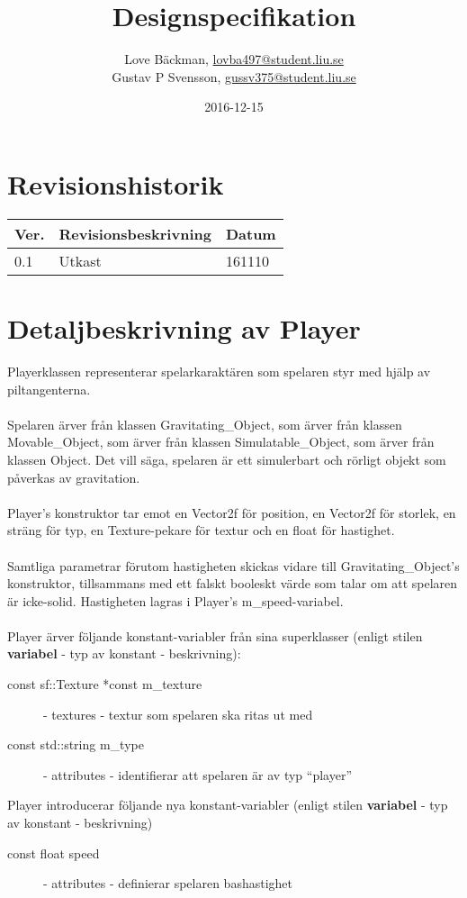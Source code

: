 \documentclass{TDP003mall}
\author{Love Bäckman, \url{lovba497@student.liu.se} \\
    Gustav P Svensson, \url{gussv375@student.liu.se}}
\title{Designspecifikation}
\date{2016-12-15}
\begin{document}
\projectpage

\tableofcontents
\newpage

\section{Revisionshistorik}
\begin{table}[!h]
\begin{tabularx}{\linewidth}{|l|X|l|}
\hline
Ver. & Revisionsbeskrivning & Datum \\\hline
0.1 & Utkast & 161110 \\\hline
\end{tabularx}
\end{table}

\section{Detaljbeskrivning av Player}
Playerklassen representerar spelarkaraktären som spelaren styr med hjälp av piltangenterna.
\\\\
Spelaren ärver från klassen Gravitating\_Object, som ärver från klassen Movable\_Object, som ärver från klassen Simulatable\_Object, som ärver från klassen Object. Det vill säga, spelaren är ett simulerbart och rörligt objekt som påverkas av gravitation.
\\\\
Player's konstruktor tar emot en Vector2f för position, en Vector2f för storlek, en sträng för typ, en Texture-pekare för textur och en float för hastighet.
\\\\
Samtliga parametrar förutom hastigheten skickas vidare till Gravitating\_Object's konstruktor, tillsammans med ett falskt booleskt värde som talar om att spelaren är icke-solid. Hastigheten lagras i Player's m\_speed-variabel.
\\\\
Player ärver följande konstant-variabler från sina superklasser (enligt stilen \textbf{variabel} - typ av konstant - beskrivning):
\begin{description}
\item[const sf::Texture *const m\_texture] - textures - textur som spelaren ska ritas ut med
\item[const std::string m\_type] - attributes - identifierar att spelaren är av typ ``player''
\end{description}

Player introducerar följande nya konstant-variabler (enligt stilen \textbf{variabel} - typ av konstant - beskrivning)
\begin{description}
\item[const float speed] - attributes - definierar spelaren bashastighet
\end{description}
\end{document}
